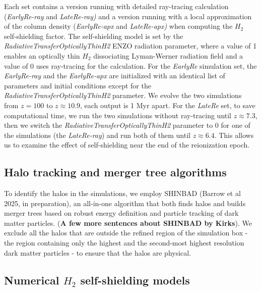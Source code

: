 \documentclass[linenumbers, twocolumn]{aastex631}
\begin{document}
Each set contains a version running with detailed ray-tracing calculation (\textit{EarlyRe-ray} and \textit{LateRe-ray)} and a version running with a local approximation of the column density (\textit{EarlyRe-apx} and \textit{LateRe-apx)} when computing the $H_{2}$ self-shielding factor. The self-shielding model is set by the \textit{RadiativeTransferOpticallyThinH2} ENZO radiation parameter, where a value of 1 enables an optically thin $H_{2}$ dissociating Lyman-Werner radiation field and a value of 0 uses ray-tracing for the calculation. For the \textit{EarlyRe} simulation set, the \textit{EarlyRe-ray} and the \textit{EarlyRe-apx} are initialized with an identical list of parameters and initial conditions except for the \textit{RadiativeTransferOpticallyThinH2} parameter. We evolve the two simulations from $z = 100$ to $z \approx 10.9$, each output is 1 Myr apart. For the \textit{LateRe} set, to save computational time, we run the two simulations without ray-tracing until $z \approx 7.3$, then we switch the \textit{RadiativeTransferOpticallyThinH2} parameter to 0 for one of the simulations (the \textit{LateRe-ray}) and run both of them until $z \approx 6.4$. This allows us to examine the effect of self-shielding near the end of the reionization epoch.


\subsection{Halo tracking and merger tree algorithms} \label{sec:halotracking}

To identify the halos in the simulations, we employ SHINBAD (Barrow et al 2025, in preparation), an all-in-one algorithm that both finds halos and builds merger trees based on robust energy definition and particle tracking of dark matter particles. (\textbf{A few more sentences about SHINBAD by Kirks}). We exclude all the halos that are outside the refined region of the simulation box - the region containing only the highest and the second-most highest resolution dark matter particles - to ensure that the halos are physical.

\subsection{Numerical $H_{2}$ self-shielding models}
\end{document}
